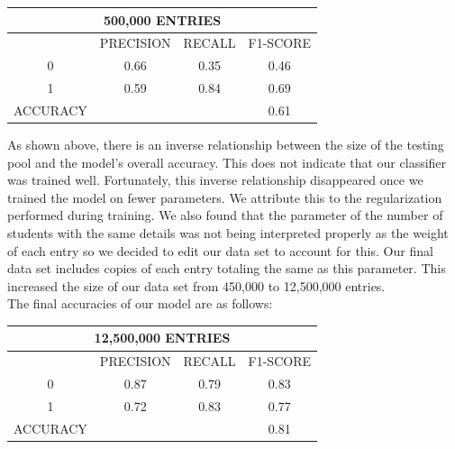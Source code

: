\documentclass{article}
\begin{document}
\begin{center}
    \begin{tabular}{ |c|c|c|c| }
    \hline
    \multicolumn{4}{|c|}{500,000 ENTRIES} \\
    \hline
    \hline
    & PRECISION & RECALL & F1-SCORE \\
    \hline
    0 & 0.66 & 0.35 & 0.46 \\
    \hline
    1 & 0.59 & 0.84 & 0.69 \\
    \hline
    \hline
    ACCURACY & & & 0.61 \\
    \hline
    \end{tabular}
\end{center}
As shown above, there is an inverse relationship between the size of the testing pool and the model's overall accuracy. This does not indicate that our classifier was trained well. Fortunately, this inverse relationship disappeared once we trained the model on fewer parameters. We attribute this to the regularization performed during training. 
We also found that the parameter of the number of students with the same details was not being interpreted properly as the weight of each entry so we decided to edit our data set to account for this. Our final data set includes copies of each entry totaling the same as this parameter. This increased the size of our data set from 450,000 to 12,500,000 entries. \\
The final accuracies of our model are as follows:

\begin{center}
    \begin{tabular}{ |c|c|c|c| }
    \hline
    \multicolumn{4}{|c|}{12,500,000 ENTRIES} \\
    \hline
    \hline
    & PRECISION & RECALL & F1-SCORE \\
    \hline
    0 & 0.87 & 0.79 & 0.83 \\
    \hline
    1 & 0.72 & 0.83 & 0.77 \\
    \hline
    \hline
    ACCURACY & & & 0.81 \\
    \hline
    \end{tabular}
\end{center}
\end{document}
